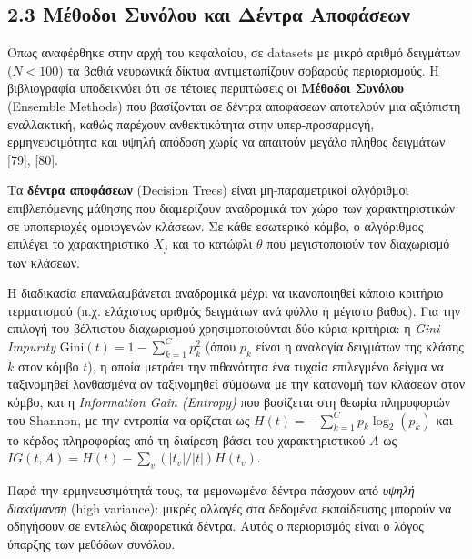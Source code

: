 \subsection{2.3 Μέθοδοι Συνόλου και Δέντρα Αποφάσεων}

Όπως αναφέρθηκε στην αρχή του κεφαλαίου, σε datasets με μικρό αριθμό δειγμάτων ($N < 100$) τα βαθιά νευρωνικά δίκτυα αντιμετωπίζουν σοβαρούς περιορισμούς. Η βιβλιογραφία υποδεικνύει ότι σε τέτοιες περιπτώσεις οι \textbf{Μέθοδοι Συνόλου} (Ensemble Methods) που βασίζονται σε δέντρα αποφάσεων αποτελούν μια αξιόπιστη εναλλακτική, καθώς παρέχουν ανθεκτικότητα στην υπερ-προσαρμογή, ερμηνευσιμότητα και υψηλή απόδοση χωρίς να απαιτούν μεγάλο πλήθος δειγμάτων [79], [80]. 

Τα \textbf{δέντρα αποφάσεων} (Decision Trees) είναι μη-παραμετρικοί αλγόριθμοι επιβλεπόμενης μάθησης που διαμερίζουν αναδρομικά τον χώρο των χαρακτηριστικών σε υποπεριοχές ομοιογενών κλάσεων. Σε κάθε εσωτερικό κόμβο, ο αλγόριθμος επιλέγει το χαρακτηριστικό $X_j$ και το κατώφλι $\theta$ που μεγιστοποιούν τον διαχωρισμό των κλάσεων. 

Η διαδικασία επαναλαμβάνεται αναδρομικά μέχρι να ικανοποιηθεί κάποιο κριτήριο τερματισμού (π.χ. ελάχιστος αριθμός δειγμάτων ανά φύλλο ή μέγιστο βάθος). Για την επιλογή του βέλτιστου διαχωρισμού χρησιμοποιούνται δύο κύρια κριτήρια: η \emph{Gini Impurity} $\text{Gini}(t) = 1 - \sum_{k=1}^{C} p_k^2$ (όπου $p_k$ είναι η αναλογία δειγμάτων της κλάσης $k$ στον κόμβο $t$), η οποία μετράει την πιθανότητα ένα τυχαία επιλεγμένο δείγμα να ταξινομηθεί λανθασμένα αν ταξινομηθεί σύμφωνα με την κατανομή των κλάσεων στον κόμβο, και η \emph{Information Gain (Entropy)} που βασίζεται στη θεωρία πληροφοριών του Shannon, με την εντροπία να ορίζεται ως $H(t) = -\sum_{k=1}^{C} p_k \log_2(p_k)$ και το κέρδος πληροφορίας από τη διαίρεση βάσει του χαρακτηριστικού $A$ ως $IG(t, A) = H(t) - \sum_{v} (|t_v|/|t|) H(t_v)$. 

Παρά την ερμηνευσιμότητά τους, τα μεμονωμένα δέντρα πάσχουν από \emph{υψηλή διακύμανση} (high variance): μικρές αλλαγές στα δεδομένα εκπαίδευσης μπορούν να οδηγήσουν σε εντελώς διαφορετικά δέντρα. Αυτός ο περιορισμός είναι ο λόγος ύπαρξης των μεθόδων συνόλου.

